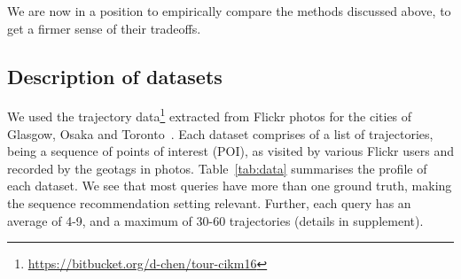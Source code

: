 
We are now in a position to empirically compare the methods discussed above,
to get a firmer sense of their tradeoffs.

%
\subsection{Description of datasets}

We used the trajectory data\footnote{\url{https://bitbucket.org/d-chen/tour-cikm16}}
extracted from Flickr photos for the cities of Glasgow, Osaka and
Toronto~\cite{ijcai15,cikm16paper}.
Each dataset comprises of a
list of trajectories, being a sequence of points of interest (POI),
as visited by various Flickr users and recorded by the geotags in photos.
Table~\ref{tab:data} summarises the profile of each dataset.
We see that most queries have more than one ground truth, making the sequence recommendation setting relevant. Further, each query has an average of 4-9, and a maximum of 30-60 trajectories (details in supplement).


